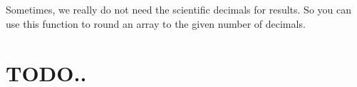 \documentclass[letterpaper,12pt,english]{sphinxmanual}
\begin{document}
\section{}
\label{\detokenize{primer:round}}
Sometimes, we really do not need the scientific decimals for  results. So you can use this function to round an array to the given number of decimals.

\begin{quote}

%
\begin{sphinxVerbatim}[commandchars=\\\{\}]
\PYG{p}{[}\PYG{p}{]}
\end{sphinxVerbatim}
\end{quote}

\begin{quote}

%
\begin{sphinxVerbatim}[commandchars=\\\{\}]
\PYG{p}{[}\PYG{p}{[}    \PYG{p}{]}
       \PYG{p}{[}   \PYG{p}{]}\PYG{p}{]}
\end{sphinxVerbatim}
\end{quote}


\section{TODO..}
\label{\detokenize{primer:todo}}

%
\begin{sphinxVerbatim}[commandchars=\\\{\}]

\end{sphinxVerbatim}


%
\begin{sphinxVerbatim}[commandchars=\\\{\}]

\end{sphinxVerbatim}
\end{document}
